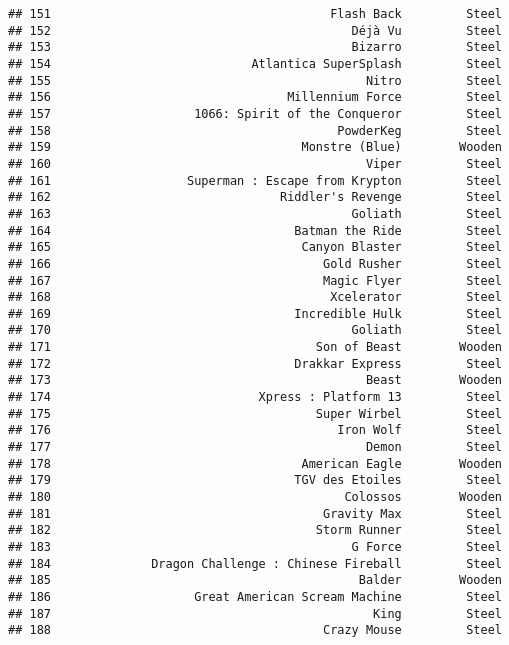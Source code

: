 \documentclass[
]{article}
\begin{document}
\begin{verbatim}
## 151                                       Flash Back         Steel
## 152                                          Déjà Vu         Steel
## 153                                          Bizarro         Steel
## 154                            Atlantica SuperSplash         Steel
## 155                                            Nitro         Steel
## 156                                 Millennium Force         Steel
## 157                    1066: Spirit of the Conqueror         Steel
## 158                                        PowderKeg         Steel
## 159                                   Monstre (Blue)        Wooden
## 160                                            Viper         Steel
## 161                   Superman : Escape from Krypton         Steel
## 162                                Riddler's Revenge         Steel
## 163                                          Goliath         Steel
## 164                                  Batman the Ride         Steel
## 165                                   Canyon Blaster         Steel
## 166                                      Gold Rusher         Steel
## 167                                      Magic Flyer         Steel
## 168                                       Xcelerator         Steel
## 169                                  Incredible Hulk         Steel
## 170                                          Goliath         Steel
## 171                                     Son of Beast        Wooden
## 172                                  Drakkar Express         Steel
## 173                                            Beast        Wooden
## 174                             Xpress : Platform 13         Steel
## 175                                     Super Wirbel         Steel
## 176                                        Iron Wolf         Steel
## 177                                            Demon         Steel
## 178                                   American Eagle        Wooden
## 179                                  TGV des Etoiles         Steel
## 180                                         Colossos        Wooden
## 181                                      Gravity Max         Steel
## 182                                     Storm Runner         Steel
## 183                                          G Force         Steel
## 184              Dragon Challenge : Chinese Fireball         Steel
## 185                                           Balder        Wooden
## 186                    Great American Scream Machine         Steel
## 187                                             King         Steel
## 188                                      Crazy Mouse         Steel

\end{verbatim}
\end{document}
